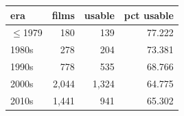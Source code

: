 \begin{tabular}{lrrr}
\toprule
era & films & usable & pct usable \\
\midrule
$\leq$1979 & 180 & 139 & 77.222 \\
1980s & 278 & 204 & 73.381 \\
1990s & 778 & 535 & 68.766 \\
2000s & 2,044 & 1,324 & 64.775 \\
2010s & 1,441 & 941 & 65.302 \\
\bottomrule
\end{tabular}